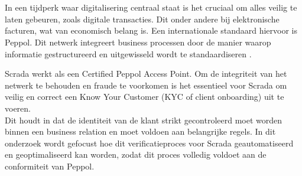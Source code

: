 
\chapter{}%
\label{ch:inleiding}

In een tijdperk waar digitalisering centraal staat is het cruciaal om alles veilig te laten gebeuren, zoals digitale transacties. 
Dit onder andere bij elektronische facturen, wat van economisch belang is.
Een internationale standaard hiervoor is Peppol. Dit netwerk integreert business processen door de manier waarop informatie 
gestructureerd en uitgewisseld wordt te standaardiseren \autocite{Peppol2022}.

Scrada werkt als een Certified Peppol Access Point. Om de integriteit van het netwerk te behouden 
en fraude te voorkomen is het essentieel voor Scrada om veilig en correct een Know Your Customer (KYC of client onboarding) uit te voeren. \\
Dit houdt in dat de identiteit van de klant strikt gecontroleerd moet worden binnen een business relation en moet voldoen aan belangrijke regels. 
In dit onderzoek wordt gefocust hoe dit verificatieproces voor Scrada
geautomatiseerd en geoptimaliseerd kan worden, zodat dit proces volledig voldoet aan de conformiteit van Peppol.



\section{}%
\label{sec:probleemstelling}

